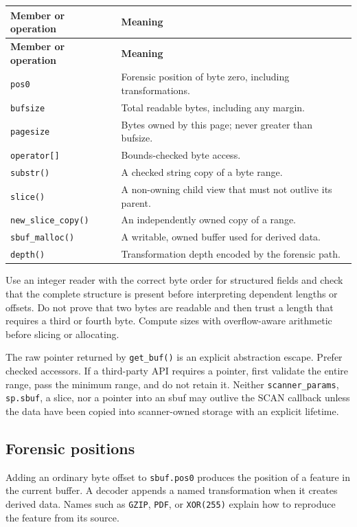 \documentclass[11pt]{article}
\newcommand{\code}[1]{\texttt{#1}}
\begin{document}
\begin{longtable}{p{.29\linewidth}p{.65\linewidth}}
\hline
\textbf{Member or operation} & \textbf{Meaning} \\
\hline
\endfirsthead
\hline
\textbf{Member or operation} & \textbf{Meaning} \\
\hline
\endhead
\code{pos0} & Forensic position of byte zero, including transformations. \\
\code{bufsize} & Total readable bytes, including any margin. \\
\code{pagesize} & Bytes owned by this page; never greater than bufsize. \\
\code{operator[]} & Bounds-checked byte access. \\
\code{substr()} & A checked string copy of a byte range. \\
\code{slice()} & A non-owning child view that must not outlive its parent. \\
\code{new\_slice\_copy()} & An independently owned copy of a range. \\
\code{sbuf\_malloc()} & A writable, owned buffer used for derived data. \\
\code{depth()} & Transformation depth encoded by the forensic path. \\
\hline
\end{longtable}

Use an integer reader with the correct byte order for structured fields and
check that the complete structure is present before interpreting dependent
lengths or offsets. Do not prove that two bytes are readable and then trust a
length that requires a third or fourth byte. Compute sizes with overflow-aware
arithmetic before slicing or allocating.

The raw pointer returned by \code{get\_buf()} is an explicit abstraction
escape. Prefer checked accessors. If a third-party API requires a pointer, first
validate the entire range, pass the minimum range, and do not retain it. Neither
\code{scanner\_params}, \code{sp.sbuf}, a slice, nor a pointer into an sbuf may
outlive the SCAN callback unless the data have been copied into scanner-owned
storage with an explicit lifetime.

\subsection{Forensic positions}

Adding an ordinary byte offset to \code{sbuf.pos0} produces the position of a
feature in the current buffer. A decoder appends a named transformation when it
creates derived data. Names such as \code{GZIP}, \code{PDF}, or
\code{XOR(255)} explain how to reproduce the feature from its source.
\end{document}
